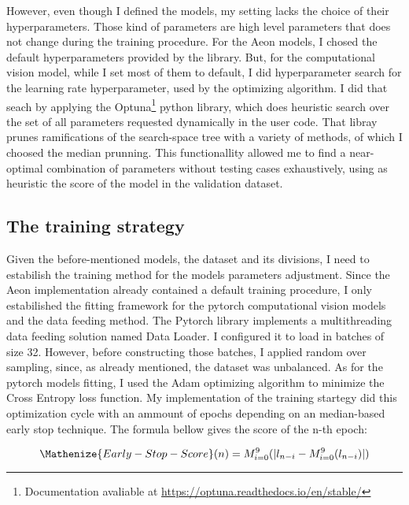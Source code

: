 



However, even though I defined the models, my setting lacks the choice of their hyperparameters. Those kind of parameters are high level parameters that does not change during the training procedure. For the Aeon models, I chosed the default hyperparameters provided by the library. But, for the computational vision model, while I set most of them to default, I did hyperparameter search for the learning rate hyperparameter, used by the optimizing algorithm. I did that seach by applying the Optuna\footnote{Documentation avaliable at \url{https://optuna.readthedocs.io/en/stable/}} python library, which does heuristic search over the set of all parameters requested dynamically in the user code. That libray prunes ramifications of the search-space tree with a variety of methods, of which I choosed the median prunning. This functionallity allowed me to find a near-optimal combination of parameters without testing cases exhaustively, using as heuristic the score of the model in the validation dataset.

\subsection{The training strategy}

Given the before-mentioned models, the dataset and its divisions, I need to estabilish the training method for the models parameters adjustment. Since the Aeon implementation already contained a default training procedure, I only estabilished the fitting framework for the pytorch computational vision models and the data feeding method. The Pytorch library implements a multithreading data feeding solution named Data Loader. I configured it to load in batches of size 32. However, before constructing those batches, I applied random over sampling, since, as already mentioned, the dataset was unbalanced. As for the pytorch models fitting, I used the Adam optimizing algorithm \cite{Adam} to minimize the Cross Entropy loss function. My implementation of the training startegy did this optimization cycle with an ammount of epochs depending on an median-based early stop technique. The formula bellow gives the score of the n-th epoch:

\begin{equation}
\Mathenize{Early-Stop-Score}(n) = M_{i=0}^{9}(|l_{n-i} - M_{i=0}^{9}(l_{n-i})|)
\end{equation}

